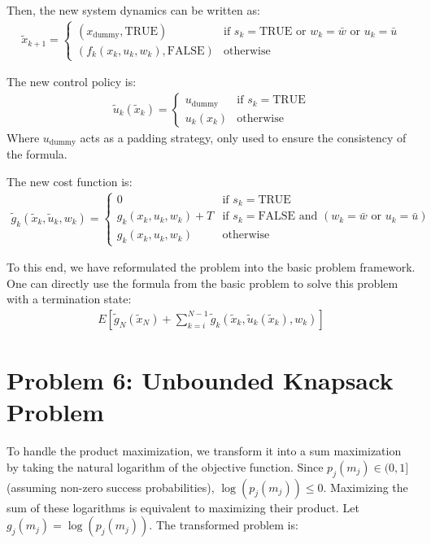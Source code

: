 \documentclass[11pt, a4paper, oneside]{memoir}
\begin{document}
Then, the new system dynamics can be written as:
\begin{align*}
  \tilde{x}_{k+1} = \begin{cases}
    (x_{\text{dummy}}, \text{TRUE}) & \text{if } s_k = \text{TRUE} \text{ or } w_k = \bar{w} \text{ or } u_k = \bar{u}\\
    (f_k(x_k, u_k, w_k), \text{FALSE}) & \text{otherwise}
  \end{cases}
\end{align*}

The new control policy is:
\begin{align*}
  \tilde{u}_k(\tilde{x}_k) = \begin{cases}
    u_{\text{dummy}} & \text{if } s_k = \text{TRUE} \\
    u_k(x_k) & \text{otherwise}
  \end{cases}
\end{align*}
Where $u_{\text{dummy}}$ acts as a padding strategy, only used to ensure the consistency of the formula.

The new cost function is:
\begin{align*}
  \tilde{g}_k(\tilde{x}_k, \tilde{u}_k, w_k) = \begin{cases}
    0 & \text{if } s_k = \text{TRUE} \\
    g_k(x_k, u_k, w_k) + T & \text{if } s_k = \text{FALSE} \text{ and } (w_k = \bar{w} \text{ or } u_k = \bar{u}) \\
    g_k(x_k, u_k, w_k) & \text{otherwise}
  \end{cases}
\end{align*}

To this end, we have reformulated the problem into the basic problem framework.
One can directly use the formula from the basic problem to solve this problem with a termination state:
\begin{align*}
  E\left[\tilde{g}_N(\tilde{x}_N) + \sum_{k=i}^{N-1} \tilde{g}_k(\tilde{x}_k, \tilde{u}_k(\tilde{x}_k), w_k) \right]
\end{align*}

\chapter{Problem 6: Unbounded Knapsack Problem}
To handle the product maximization,
we transform it into a sum maximization by taking the natural logarithm of the objective function.
Since $p_j(m_j) \in (0, 1]$ (assuming non-zero success probabilities), $\log(p_j(m_j)) \leq 0$.
Maximizing the sum of these logarithms is equivalent to maximizing their product.
Let $g_j(m_j) = \log(p_j(m_j))$. The transformed problem is:
\end{document}
